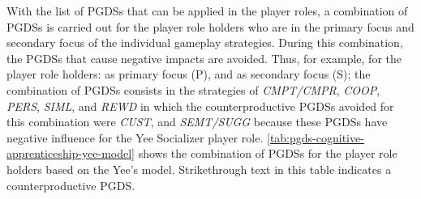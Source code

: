 With the list of PGDSs that can be applied in the player roles, a combination of PGDSs is carried out for the player role holders who are in the primary focus and secondary focus of the individual gameplay strategies. During this combination, the PGDSs that cause negative impacts are avoided. Thus, for example, for the player role holders:  as primary focus (P), and  as secondary focus (S); the combination of PGDSs consists in the strategies of \emph{CMPT/CMPR}, \emph{COOP}, \emph{PERS}, \emph{SIML}, and \emph{REWD} in which the counterproductive PGDSs avoided for this combination were \emph{CUST}, and \emph{SEMT/SUGG} because these PGDSs have negative influence for the Yee Socializer player role. \autoref{tab:pgds-cognitive-apprenticeship-yee-model} shows the combination of PGDSs for the player role holders based on the Yee's model. Strikethrough text in this table indicates a counterproductive PGDS. 


